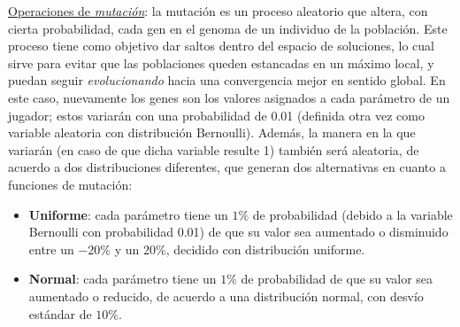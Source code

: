 \documentclass[12pt,a4paper]{article}
\begin{document}
    \underline{Operaciones de \textit{mutación}}: la mutación es un proceso aleatorio que altera, con cierta probabilidad, cada gen en el genoma de un individuo de la población. Este proceso tiene como objetivo dar saltos dentro del espacio de soluciones, lo cual sirve para evitar que las poblaciones queden estancadas  en un máximo local, y puedan seguir \textit{evolucionando} hacia una convergencia mejor en sentido global. En este caso, nuevamente los genes son los valores asignados a cada parámetro de un jugador; estos variarán con una probabilidad de 0.01 (definida otra vez como variable aleatoria con distribución Bernoulli). Además, la manera en la que variarán (en caso de que dicha variable resulte 1) también será aleatoria, de acuerdo a dos distribuciones diferentes, que generan dos alternativas en cuanto a funciones de mutación:
        \begin{itemize}
            \item \textbf{Uniforme}: cada parámetro tiene un $1\%$ de probabilidad (debido a la variable Bernoulli con probabilidad 0.01) de que su valor sea aumentado o disminuido entre un $-20\%$ y un $20\%$, decidido con distribución uniforme.
            \item \textbf{Normal}: cada parámetro tiene un $1\%$ de probabilidad de que su valor sea aumentado o reducido, de acuerdo a una distribución normal, con desvío estándar de $10\%$.
        \end{itemize}
        
\end{document}
